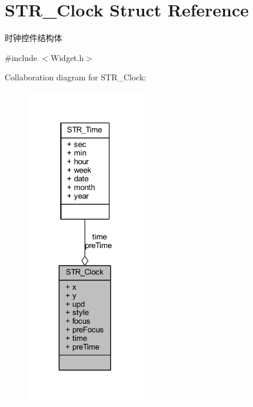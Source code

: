 \hypertarget{struct_s_t_r___clock}{\section{\-S\-T\-R\-\_\-\-Clock \-Struct \-Reference}
\label{struct_s_t_r___clock}
}


时钟控件结构体  




{\ttfamily \#include $<$\-Widget.\-h$>$}



\-Collaboration diagram for \-S\-T\-R\-\_\-\-Clock\-:\nopagebreak
\begin{figure}[H]
\begin{center}
\leavevmode
\includegraphics[width=148pt]{struct_s_t_r___clock__coll__graph}
\end{center}
\end{figure}
